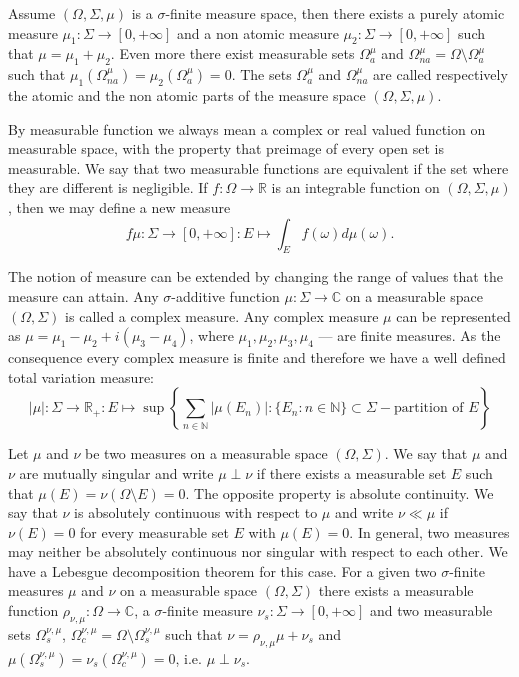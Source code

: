 Assume $(\Omega,\Sigma,\mu)$ is a $\sigma$-finite measure space, then there
exists a purely atomic measure $\mu_1:\Sigma\to[0,+\infty]$ and a non atomic
measure $\mu_2:\Sigma\to[0,+\infty]$ such that $\mu=\mu_1+\mu_2$. Even more
there exist measurable sets $\Omega_a^{\mu}$ and
$\Omega_{na}^{\mu}=\Omega\setminus \Omega_a^{\mu}$ such that
$\mu_1(\Omega_{na}^{\mu})=\mu_2(\Omega_a^{\mu})=0$. The sets $\Omega_a^{\mu}$
and $\Omega_{na}^{\mu}$ are called respectively the atomic and the non atomic
parts of the measure space $(\Omega,\Sigma,\mu)$.

By measurable function we always mean a complex or real valued function on
measurable space, with the property that preimage of every open set is
measurable. We say that two measurable functions are equivalent if the set where
they are different is negligible. If $f:\Omega\to\mathbb{R}$ is an  integrable
function on $(\Omega,\Sigma,\mu)$, then we may define a new measure 
$$
f\mu:\Sigma\to[0,+\infty]:E\mapsto\int_{E}f(\omega)d\mu(\omega).
$$

The notion of measure can be extended by changing the range of values that the
measure can attain. Any $\sigma$-additive function $\mu:\Sigma\to\mathbb{C}$ on
a measurable space $(\Omega,\Sigma)$ is called a complex measure. Any complex
measure $\mu$ can be represented as $\mu=\mu_1-\mu_2+i(\mu_3-\mu_4)$, where
$\mu_1,\mu_2,\mu_3,\mu_4$ --- are finite measures. As the consequence every
complex measure is finite and therefore we have a well defined total variation
measure:
$$
|\mu|:\Sigma\to\mathbb{R}_+
:E\mapsto\sup\left \{\sum_{n\in\mathbb{N}}|\mu(E_n)|
: \{E_n:n\in\mathbb{N} \}\subset\Sigma -\mbox{partition of }E\right \}
$$

Let $\mu$ and $\nu$ be two measures on a measurable space $(\Omega,\Sigma)$. We
say that $\mu$ and $\nu$ are mutually singular and write $\mu\perp\nu$ if there
exists a measurable set $E$ such that $\mu(E)=\nu(\Omega\setminus E)=0$. The
opposite property is absolute continuity. We say that $\nu$ is absolutely
continuous with respect to $\mu$ and write $\nu\ll\mu$ if $\nu(E)=0$ for every
measurable set $E$ with $\mu(E)=0$. In general, two measures may neither be
absolutely continuous nor singular with respect to each other. We have a
Lebesgue decomposition theorem for this case. For a given two $\sigma$-finite
measures $\mu$ and $\nu$ on a measurable space $(\Omega,\Sigma)$ there exists a
measurable function $\rho_{\nu,\mu}:\Omega\to\mathbb{C}$, a $\sigma$-finite
measure $\nu_s:\Sigma\to[0,+\infty]$ and two measurable sets
$\Omega_s^{\nu,\mu}$, $\Omega_c^{\nu,\mu}=\Omega\setminus\Omega_s^{\nu,\mu}$
such that $\nu=\rho_{\nu,\mu}\mu+\nu_s$ and
$\mu(\Omega_s^{\nu,\mu})=\nu_s(\Omega_c^{\nu,\mu})=0$, i.e. $\mu\perp\nu_s$.

